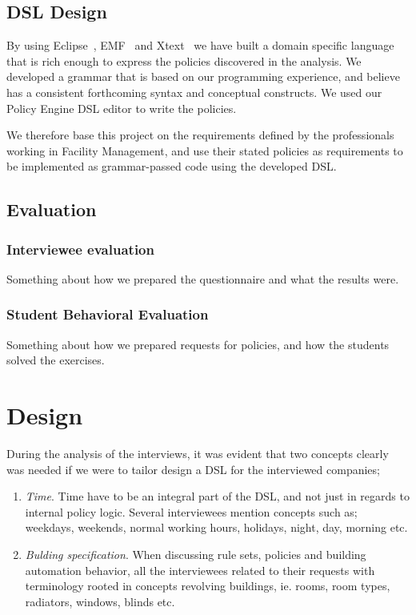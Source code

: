 \documentclass{llncs}
\begin{document}
\subsection{DSL Design}\label{subsec:dsldesign}
By using Eclipse~\cite{eclipse}, EMF~\cite{emf} and Xtext~\cite{xtext} we have built a domain specific language that is rich enough to express the policies discovered in the analysis. We developed a grammar that is based on our programming experience, and believe has a consistent forthcoming syntax and conceptual constructs. We used our Policy Engine DSL editor to write the policies.

We therefore base this project on the requirements defined by the professionals working in Facility Management, and use their stated policies as requirements to be implemented as grammar-passed code using the developed DSL.

\subsection{Evaluation}\label{subsec:method-evaluation}

\subsubsection{Interviewee evaluation}\label{subsec:interviewee-evaluation}
Something about how we prepared the questionnaire and what the results were.

\subsubsection{Student Behavioral Evaluation}\label{subsec:student-evaluation}
Something about how we prepared requests for policies, and how the students solved the exercises.

\section{Design}\label{sec:design}
During the analysis of the interviews, it was evident that two concepts clearly was needed if we were to tailor design a DSL for the interviewed companies;
\begin{enumerate}
	\item \textit{Time}. Time have to be an integral part of the DSL, and not just in regards to internal policy logic. Several interviewees mention concepts such as; weekdays, weekends, normal working hours, holidays, night, day, morning etc.
	\item \textit{Bulding specification}. When discussing rule sets, policies and building automation behavior, all the interviewees related to their requests with terminology rooted in concepts revolving buildings, ie. rooms, room types, radiators, windows, blinds etc.
\end{enumerate}
\end{document}
